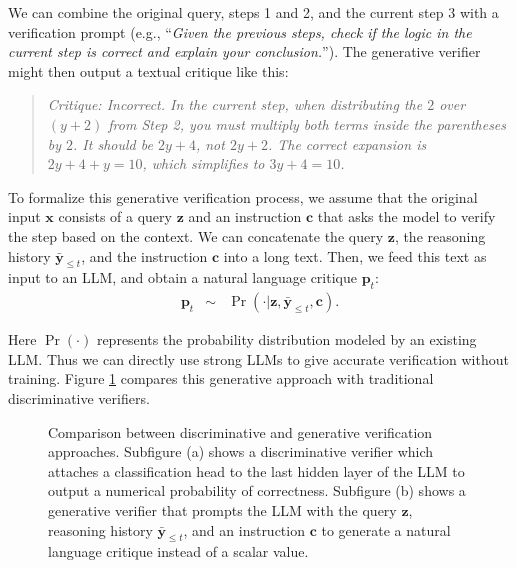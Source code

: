 We can combine the original query, steps 1 and 2, and the current step 3 with a verification prompt (e.g., ``\textit{Given the previous steps, check if the logic in the current step is correct and explain your conclusion.}''). The generative verifier might then output a textual critique like this:
\vspace{0.5em}
\begin{quote}
\textit{Critique: Incorrect. In the current step, when distributing the $2$ over $(y + 2)$ from Step 2, you must multiply both terms inside the parentheses by $2$. It should be $2y + 4$, not $2y + 2$. The correct expansion is $2y + 4 + y = 10$, which simplifies to $3y + 4 = 10$.}
\end{quote}
\vspace{0.5em}

To formalize this generative verification process, we assume that the original input $\mathbf{x}$ consists of a query $\mathbf{z}$ and an instruction $\mathbf{c}$ that asks the model to verify the step based on the context. We can concatenate the query $\mathbf{z}$, the reasoning history $\bar{\mathbf{y}}_{\le t}$, and the instruction $\mathbf{c}$ into a long text. Then, we feed this text as input to an LLM, and obtain a natural language critique $\mathbf{p}_t$:
\begin{eqnarray}
\mathbf{p}_t & \sim & \Pr(\cdot | \mathbf{z}, \bar{\mathbf{y}}_{\le t}, \mathbf{c}).
\end{eqnarray}

\noindent Here $\Pr(\cdot)$ represents the probability distribution modeled by an existing LLM. Thus we can directly use strong LLMs to give accurate verification without training. Figure \ref{fig:pre-generative-verfication} compares this generative approach with traditional discriminative verifiers.

\begin{figure}[!t]
\centering

\caption{Comparison between discriminative and generative verification approaches. Subfigure (a) shows a discriminative verifier which attaches a classification head to the last hidden layer of the LLM to output a numerical probability of correctness. Subfigure (b) shows a generative verifier that prompts the LLM with the query $\mathbf{z}$, reasoning history $\bar{\mathbf{y}}_{\le t}$, and an instruction $\mathbf{c}$ to generate a natural language critique instead of a scalar value.}
\label{fig:pre-generative-verfication}
\end{figure}

